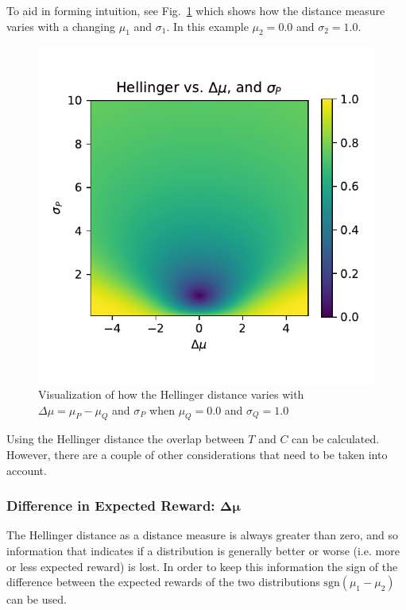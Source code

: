 To aid in forming intuition, see Fig.~\ref{fig:hellinger_surf} which shows how the distance measure varies with a changing $\mu_1$ and $\sigma_1$. In this example $\mu_2=0.0$ and $\sigma_2=1.0$.

\begin{figure}[tbp]
    \centering
    \includegraphics[width=0.9\linewidth]{Figures/hellinger_surf}
    \caption{Visualization of how the Hellinger distance varies with $\Delta\mu=\mu_P-\mu_Q$ and $\sigma_P$ when $\mu_Q=0.0$ and $\sigma_Q=1.0$}
    \label{fig:hellinger_surf}
\end{figure}

Using the Hellinger distance the overlap between $T$ and $C$ can be calculated. However, there are a couple of other considerations that need to be taken into account. 

\subsubsection{Difference in Expected Reward: $\pmb{\Delta \mu}$}
The Hellinger distance as a distance measure is always greater than zero, and so information that indicates if a distribution is generally better or worse (i.e. more or less expected reward) is lost. In order to keep this information the sign of the difference between the expected rewards of the two distributions $\text{sgn}(\mu_1-\mu_2)$ can be used.

